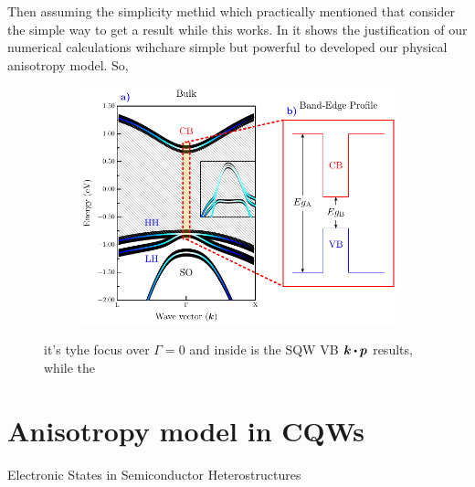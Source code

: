 Then assuming the simplicity methid which practically mentioned that consider the simple way to get a result while this works. In  it shows the justification of our numerical calculations wihchare simple but powerful to developed our physical anisotropy model. So,
\begin{figure}
	\centering
	\begin{subfigure}{\textwidth}
	\includegraphics[width=\textwidth]{../figures/chapter-2/numerical-calculations/out/band-edge}
	\label{subfig:chapter2-sec-numerical-calculations-band-edge-a}
	\label{subfig:chapter2-sec-numerical-calculations-band-edge-b}
	\end{subfigure}
	\caption{ it's tyhe focus over $\Gamma=0$ and inside is the SQW VB $\boldsymbol{k}\bigcdot \boldsymbol{p}$ results,  while the  }
	\label{fig:chapter2-sec-numerical-calculations-band-edge}
\end{figure}

\section{Anisotropy model in CQWs \label{sub:chap2-anisotropy-model}}


Electronic States in Semiconductor Heterostructures 